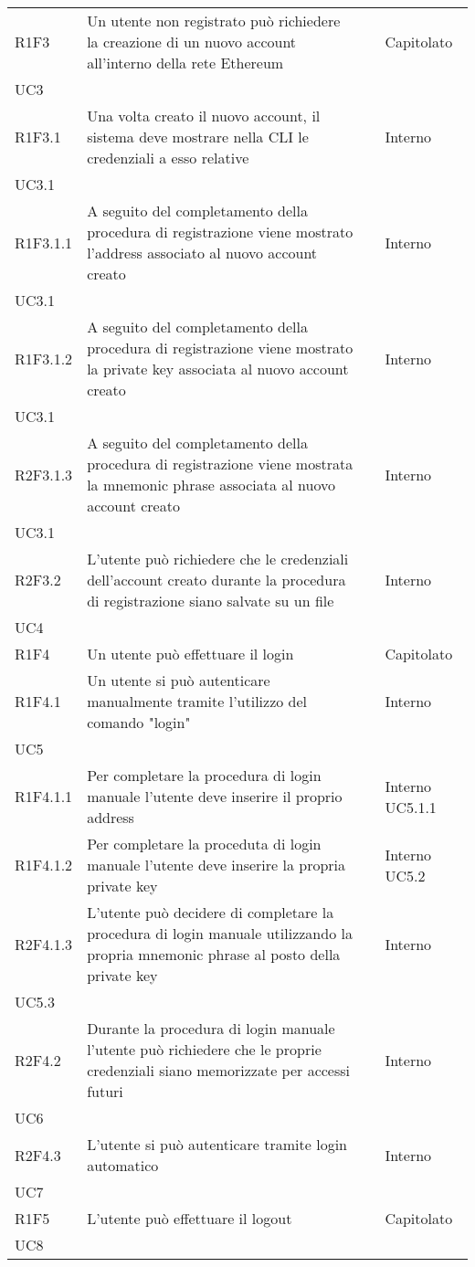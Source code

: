 \begin{longtable}{ 
		>{\centering}p{} 
		>{}p{} 
		>{\centering}p{}
		>{\centering}p{} }
	R1F3 & Un utente non registrato può richiedere la creazione di un nuovo account
			 all'interno della rete Ethereum 										& \ob & Capitolato \\ UC3 \tabularnewline
	R1F3.1 & Una volta creato il nuovo account, il sistema deve mostrare nella 
			CLI le credenziali a esso relative										& \ob & Interno \\ UC3.1 \tabularnewline
	R1F3.1.1 & A seguito del completamento della procedura di registrazione viene
			mostrato l'address associato al nuovo account creato 					& \ob & Interno \\ UC3.1 \tabularnewline
	R1F3.1.2 & A seguito del completamento della procedura di registrazione viene
			mostrato la private key associata al nuovo account creato 				& \ob & Interno \\ UC3.1 \tabularnewline
	R2F3.1.3 & A seguito del completamento della procedura di registrazione viene
			mostrata la mnemonic phrase associata al nuovo account creato 			& \de & Interno \\ UC3.1 \tabularnewline
	R2F3.2 & L'utente può richiedere che le credenziali dell'account creato durante
			la procedura di registrazione siano salvate su un file 					& \de & Interno \\ UC4 \tabularnewline

	R1F4 & Un utente può effettuare il login 										& \ob & Capitolato \tabularnewline
	R1F4.1 & Un utente si può autenticare manualmente tramite l'utilizzo 
			del comando "login" 													& \ob & Interno \\ UC5 \tabularnewline
	R1F4.1.1 & Per completare la procedura di login manuale l'utente deve inserire
			 il proprio address														& \ob & Interno UC5.1.1 \tabularnewline
	R1F4.1.2 & Per completare la proceduta di login manuale l'utente deve inserire
			 la propria private key 												& \ob & Interno UC5.2 \tabularnewline
	R2F4.1.3 & L'utente può decidere di completare la procedura di login manuale 
			 utilizzando la propria mnemonic phrase al posto della private key		& \de & Interno \\ UC5.3 \tabularnewline
	R2F4.2 & Durante la procedura di login manuale l'utente può richiedere che
			 le proprie credenziali siano memorizzate per accessi futuri 			& \de & Interno \\ UC6 \tabularnewline
	R2F4.3 & L'utente si può autenticare tramite login automatico 					& \de & Interno \\ UC7 \tabularnewline
	
	R1F5 & L'utente può effettuare il logout 										& \ob & Capitolato \\ UC8 \tabularnewline 
	

\end{longtable}
